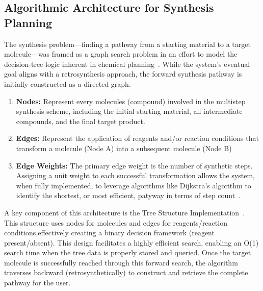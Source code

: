 \documentclass[12pt]{article}
\begin{document}
\subsection{Algorithmic Architecture for Synthesis Planning}
The synthesis problem—finding a pathway from a starting material to a target molecule—was framed as a graph search problem in an effort to model the decision-tree logic inherent in chemical planning~\cite{10.1016/j.tcs.2025.115084}.
While the system's eventual goal aligns with a retrosynthesis approach, the forward synthesis pathway is initially constructed as a directed graph.
\begin{enumerate}
    \item \textbf{Nodes:} Represent every molecules (compound) involved in the multistep synthesis scheme, including the initial starting material, all intermediate compounds, and the final target product.
    \item \textbf{Edges:} Represent the application of reagents and/or reaction conditions that transform a molecule (Node A) into a subsequent molecule (Node B)
    \item \textbf{Edge Weights:} The primary edge weight is the number of synthetic steps. Assigning a unit weight to each successful transformation allows the system, when fully implemented, to leverage algorithms like Dijkstra's algorithm to identify the shortest, or most efficient, patyway in terms of step count~\cite{clrsAlgorithms}.
\end{enumerate}
A key component of this architecture is the Tree Structure Implementation~\cite{10.1109/ICTAI.2004.38}.
This structure uses nodes for molecules and edges for reagents/reaction conditions,effectively creating a binary decision framework (reagent present/absent).
This design facilitates a highly efficient search, enabling an O(1) search time when the tree data is properly stored and queried.
Once the target molecule is successfully reached through this forward search, the algorithm traverses backward (retrosynthetically) to construct and retrieve the complete pathway for the user.
\end{document}
